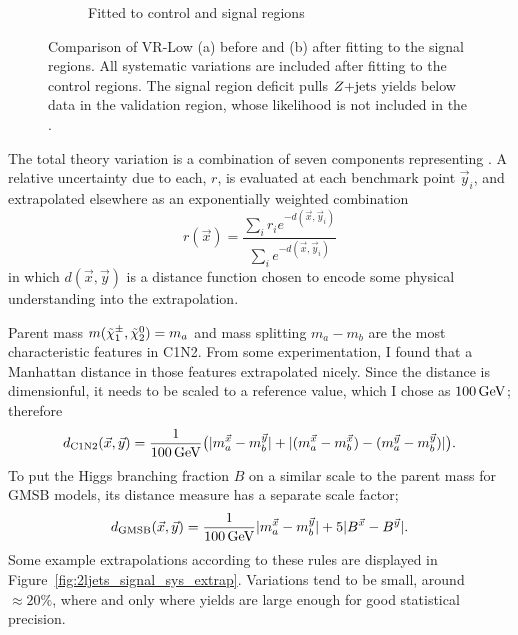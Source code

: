 \begin{figure}[tp]
\begin{subfigure}{0.48\textwidth}
\caption{Fitted to control and signal regions}
\end{subfigure}
\caption[
Comparison of VR-Low before and after fitting to the signal regions
]{%
Comparison of VR-Low (a) before and (b) after fitting to the signal regions.
All systematic variations are included after fitting to the control regions.
The signal region deficit pulls $\zjets$ yields below data in the validation
region, whose likelihood is not included in the \heplikelihood.
}
\label{fig:2ljets_low_vrlow_pre_post}
\end{figure}


The total theory variation is a combination of seven components representing
.
A relative uncertainty due to each, $r$, is evaluated at each benchmark
point $\vec y_i$, and extrapolated elsewhere as an exponentially weighted
combination
\begin{equation}
\label{eqn:2ljets_signal_extrap}
r(\vec x) = \frac{
\sum_i r_i e^{-d(\vec x, \vec y_i)}
}{
\sum_i e^{-d(\vec x, \vec y_i)}
}
\end{equation}
in which $d(\vec x, \vec y)$ is a distance function chosen to encode some
physical understanding into the extrapolation.

Parent mass $m(\chargino_1, \neutralino_2) = m_a$
and mass splitting $m_a - m_b$ are the most
characteristic features in C1N2.
From some experimentation, I found that a Manhattan distance in those features
extrapolated nicely.
Since the distance is dimensionful, it needs to be scaled to a reference value,
which I chose as $100\,\eV[G]$; therefore
\begin{equation}
d_\mathrm{C1N2}(\vec x, \vec y) =
\frac{1}{100\,\eV[G]}
\big(
|m_a^{\vec x} - m_b^{\vec y}|
+
|(m_a^{\vec x} - m_b^{\vec x}) - (m_a^{\vec y} - m_b^{\vec y})|
\big)
.
\end{equation}
To put the Higgs branching fraction $B$ on a similar scale to the parent mass
for GMSB models, its distance measure has a separate scale factor;
\begin{equation}
d_\mathrm{GMSB}(\vec x, \vec y) =
\frac{1}{100\,\eV[G]}
|m_a^{\vec x} - m_b^{\vec y}|
+
5
|B^{\vec x} - B^{\vec y}|
.
\end{equation}
Some example extrapolations according to these rules are displayed in
Figure~\ref{fig:2ljets_signal_sys_extrap}.
Variations tend to be small, around $\approx 20\%$, where and only where
yields are large enough for good statistical precision.

